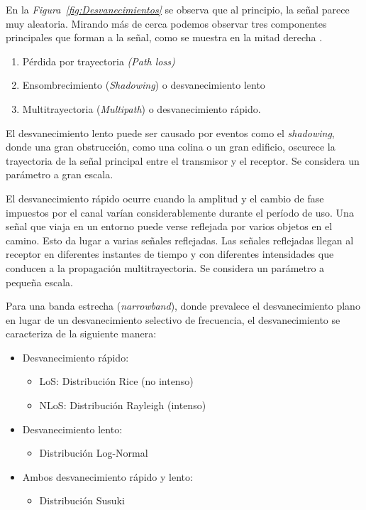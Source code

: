 En la \textit{Figura~\ref{fig:Desvanecimientos}} se observa que al principio, la señal parece muy aleatoria. Mirando más de cerca podemos observar tres componentes principales que forman a la señal, como se muestra en la mitad derecha \parencite{Mathuranathan2016}.
\begin{enumerate}
    \item  Pérdida por trayectoria \textit{(Path loss)}
    \item  Ensombrecimiento (\textit{Shadowing}) o desvanecimiento lento
    \item  Multitrayectoria (\textit{Multipath}) o desvanecimiento rápido.
\end{enumerate}

El desvanecimiento lento puede ser causado por eventos como el \textit{shadowing}, donde una gran obstrucción, como una colina o un gran edificio, oscurece la trayectoria de la señal principal entre el transmisor y el receptor. Se considera un parámetro a gran escala.\newline

El desvanecimiento rápido ocurre cuando la amplitud y el cambio de fase impuestos por el canal varían considerablemente durante el período de uso. Una señal que viaja en un entorno puede verse reflejada por varios objetos en el camino. Esto da lugar a varias señales reflejadas. Las señales reflejadas llegan al receptor en diferentes instantes de tiempo y con diferentes intensidades que conducen a la propagación multitrayectoria. Se considera un parámetro a pequeña escala.\newline

Para una banda estrecha (\textit{narrowband}), donde prevalece el desvanecimiento plano en lugar de un desvanecimiento selectivo de frecuencia, el desvanecimiento se caracteriza de la siguiente manera:
\begin{itemize}
    \item Desvanecimiento rápido:
    \begin{itemize}
        \item LoS: Distribución Rice (no intenso)
        \item NLoS: Distribución Rayleigh (intenso)
    \end{itemize}
    \item Desvanecimiento lento:
    \begin{itemize}
        \item Distribución Log-Normal
    \end{itemize}
    \item Ambos desvanecimiento rápido y lento:
    \begin{itemize}
        \item Distribución Susuki
    \end{itemize}
\end{itemize}

